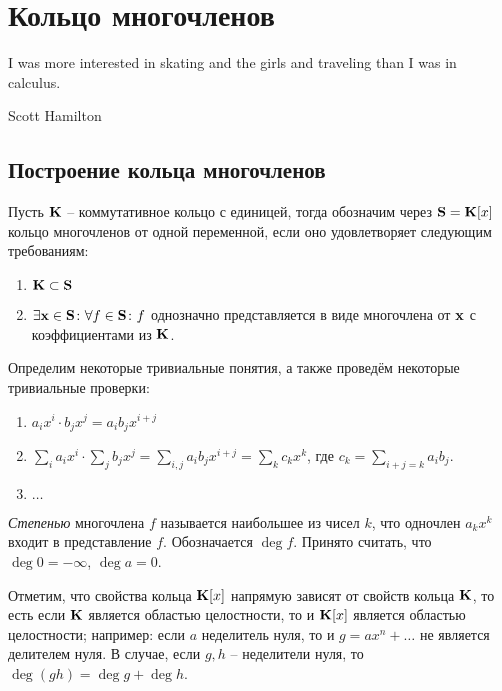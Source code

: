 \section{Кольцо многочленов}
\label{polynom}

\epigraph{I was more interested in skating and the girls and traveling
  than I was in calculus.}{Scott Hamilton}

\subsection{Построение кольца многочленов}

Пусть $\mathbf{K}$ -- коммутативное кольцо с единицей, тогда обозначим через $\mathbf{S}=\mathbf{K}[x]$ кольцо многочленов от одной переменной, если оно удовлетворяет следующим требованиям:

\begin{enumerate}
  \item $\mathbf{K}\subset\mathbf{S}$
  \item $\exists{\bf x}\in\mathbf{S}\colon\forall f\in\mathbf{S}\colon f$ однозначно представляется в виде многочлена от ${\bf x}$ с коэффициентами из $\mathbf{K}$.
\end{enumerate}

Определим некоторые тривиальные понятия, а также проведём некоторые тривиальные проверки:

\begin{enumerate}
  \item $a_ix^i\cdot b_jx^j = a_ib_jx^{i+j}$
  \item $\sum\limits_i a_ix^i\cdot\sum\limits_jb_jx^j=\sum\limits_{i,j}a_ib_jx^{i+j}=\sum\limits_kc_kx^k$, где $c_k=\sum\limits_{i+j=k}a_ib_j$.
  \item $\dots$
\end{enumerate}

\begin{df}
  \emph{Степенью} многочлена $f$ называется наибольшее из чисел $k$, что одночлен $a_kx^k$ входит в представление $f$. Обозначается $\deg f$. Принято считать, что $\deg0=-\infty$, $\deg a = 0$.
\end{df}

Отметим, что свойства кольца $\mathbf{K}[x]$ напрямую зависят от свойств кольца $\mathbf{K}$, то есть если $\mathbf{K}$ является областью целостности, то и $\mathbf{K}[x]$ является областью целостности; например: если $a$ неделитель нуля, то и $g=ax^n+\dots$ не является делителем нуля. В случае, если $g,h$ -- неделители нуля, то $\deg(gh)=\deg g+\deg h$.

